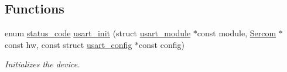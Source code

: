 \subsection*{Functions}
\begin{DoxyCompactItemize}
\item 
enum \hyperlink{group__group__sam0__utils__status__codes_ga751c892e5a46b8e7d282085a5a5bf151}{status\+\_\+code} \hyperlink{group__asfdoc__sam0__sercom__usart__group_gad67046f395137b2a7a1ef72f83907674}{usart\+\_\+init} (struct \hyperlink{structusart__module}{usart\+\_\+module} $\ast$const module, \hyperlink{union_sercom}{Sercom} $\ast$const hw, const struct \hyperlink{structusart__config}{usart\+\_\+config} $\ast$const config)
\begin{DoxyCompactList}\small\item\em Initializes the device. \end{DoxyCompactList}\end{DoxyCompactItemize}
